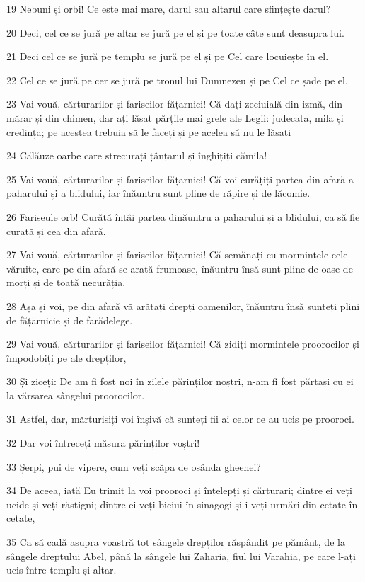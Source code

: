 \par 19 Nebuni și orbi! Ce este mai mare, darul sau altarul care sfințește darul?
\par 20 Deci, cel ce se jură pe altar se jură pe el și pe toate câte sunt deasupra lui.
\par 21 Deci cel ce se jură pe templu se jură pe el și pe Cel care locuiește în el.
\par 22 Cel ce se jură pe cer se jură pe tronul lui Dumnezeu și pe Cel ce șade pe el.
\par 23 Vai vouă, cărturarilor și fariseilor fățarnici! Că dați zeciuială din izmă, din mărar și din chimen, dar ați lăsat părțile mai grele ale Legii: judecata, mila și credința; pe acestea trebuia să le faceți și pe acelea să nu le lăsați
\par 24 Călăuze oarbe care strecurați țânțarul și înghițiți cămila!
\par 25 Vai vouă, cărturarilor și fariseilor fățarnici! Că voi curățiți partea din afară a paharului și a blidului, iar înăuntru sunt pline de răpire și de lăcomie.
\par 26 Fariseule orb! Curăță întâi partea dinăuntru a paharului și a blidului, ca să fie curată și cea din afară.
\par 27 Vai vouă, cărturarilor și fariseilor fățarnici! Că semănați cu mormintele cele văruite, care pe din afară se arată frumoase, înăuntru însă sunt pline de oase de morți și de toată necurăția.
\par 28 Așa și voi, pe din afară vă arătați drepți oamenilor, înăuntru însă sunteți plini de fățărnicie și de fărădelege.
\par 29 Vai vouă, cărturarilor și fariseilor fățarnici! Că zidiți mormintele proorocilor și împodobiți pe ale drepților,
\par 30 Și ziceți: De am fi fost noi în zilele părinților noștri, n-am fi fost părtași cu ei la vărsarea sângelui proorocilor.
\par 31 Astfel, dar, mărturisiți voi înșivă că sunteți fii ai celor ce au ucis pe prooroci.
\par 32 Dar voi întreceți măsura părinților voștri!
\par 33 Șerpi, pui de vipere, cum veți scăpa de osânda gheenei?
\par 34 De aceea, iată Eu trimit la voi prooroci și înțelepți și cărturari; dintre ei veți ucide și veți răstigni; dintre ei veți biciui în sinagogi și-i veți urmări din cetate în cetate,
\par 35 Ca să cadă asupra voastră tot sângele drepților răspândit pe pământ, de la sângele dreptului Abel, până la sângele lui Zaharia, fiul lui Varahia, pe care l-ați ucis între templu și altar.
